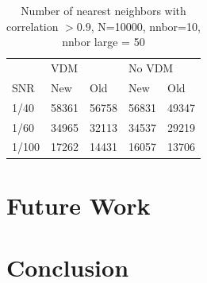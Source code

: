 \documentclass{article}
\begin{document}
\begin{table}[]
\centering
\caption{Number of nearest neighbors with correlation $>0.9$, 
N=10000, nnbor=10, nnbor large = 50
}
\label{my-label}
\begin{tabular}{lllll}
      & \multicolumn{2}{l}{VDM} & \multicolumn{2}{l}{No VDM} \\ \cline{2-5} 
SNR   & New        & Old        & New          & Old         \\ \cline{2-5} 
1/40 & 58361          & 56758          & 56831            & 49347       \\
1/60  & 34965          & 32113          & 34537            & 29219       \\
1/100 & 17262      & 14431      & 16057        & 13706        \\ \cline{2-5} 
\end{tabular}
\end{table}

\section{Future Work}
\section{Conclusion}





\end{document}
